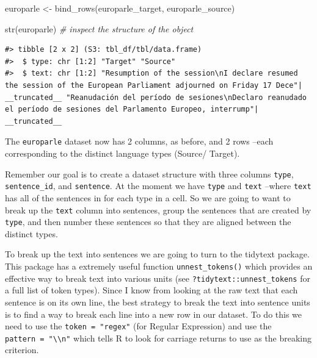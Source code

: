 \documentclass[
  letterpaper,
]{latex/krantz}
\newenvironment{Shaded}{\begin{snugshade}}{\end{snugshade}}
\newcommand{\CommentTok}[1]{\textcolor[rgb]{0.00,0.00,0.00}{\textit{#1}}}
\newcommand{\FunctionTok}[1]{\textcolor[rgb]{0.00,0.00,0.00}{#1}}
\newcommand{\NormalTok}[1]{\textcolor[rgb]{0.00,0.00,0.00}{#1}}
\newcommand{\OtherTok}[1]{\textcolor[rgb]{0.00,0.00,0.00}{#1}}
\begin{document}
\begin{Shaded}
\begin{Highlighting}[]
\NormalTok{europarle }\OtherTok{\textless{}{-}} 
  \FunctionTok{bind\_rows}\NormalTok{(europarle\_target, europarle\_source)}

\FunctionTok{str}\NormalTok{(europarle) }\CommentTok{\# inspect the structure of the object}
\end{Highlighting}
\end{Shaded}

\begin{verbatim}
#> tibble [2 x 2] (S3: tbl_df/tbl/data.frame)
#>  $ type: chr [1:2] "Target" "Source"
#>  $ text: chr [1:2] "Resumption of the session\nI declare resumed the session of the European Parliament adjourned on Friday 17 Dece"| __truncated__ "Reanudación del período de sesiones\nDeclaro reanudado el período de sesiones del Parlamento Europeo, interrump"| __truncated__
\end{verbatim}

The \texttt{europarle} dataset now has 2 columns, as before, and 2 rows
--each corresponding to the distinct language types (Source/ Target).

Remember our goal is to create a dataset structure with three columns
\texttt{type}, \texttt{sentence\_id}, and \texttt{sentence}. At the
moment we have \texttt{type} and \texttt{text} --where \texttt{text} has
all of the sentences in for each type in a cell. So we are going to want
to break up the \texttt{text} column into sentences, group the sentences
that are created by \texttt{type}, and then number these sentences so
that they are aligned between the distinct types.

To break up the text into sentences we are going to turn to the tidytext
package. This package has a extremely useful function
\texttt{unnest\_tokens()} which provides an effective way to break text
into various units (see \texttt{?tidytext::unnest\_tokens} for a full
list of token types). Since I know from looking at the raw text that
each sentence is on its own line, the best strategy to break the text
into sentence units is to find a way to break each line into a new row
in our dataset. To do this we need to use the \texttt{token\ =\ "regex"}
(for Regular Expression) and use the
\texttt{pattern\ =\ "\textbackslash{}\textbackslash{}n"} which tells R
to look for carriage returns to use as the breaking criterion.
\end{document}
